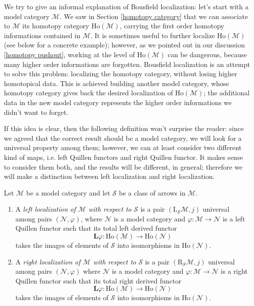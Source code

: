 We try to give an informal explanation of Bousfield localization: let's start with a model category $\mathcal M$. We saw in Section \ref{homotopy category} that we can associate to $\mathcal M$ its homotopy category $\mathrm{Ho}(\mathcal M)$, carrying the first order homotopy informations contained in $\mathcal M$. It is sometimes useful to further localize $\mathrm{Ho}(\mathcal M)$ (see below for a concrete example); however, as we pointed out in our discussion \ref{homotopy pushout}, working at the level of $\mathrm{Ho}(\mathcal M)$ can be dangerous, because many higher order informations are forgotten. Bousfield localization is an attempt to solve this problem: localizing the homotopy category, without losing higher homotopical data. This is achieved building another model category, whose homotopy category gives back the desired localization of $\mathrm{Ho}(\mathcal M)$; the additional data in the new model category represents the higher order informations we didn't want to forget.

If this idea is clear, then the following definition won't surprise the reader: since we agreed that the correct result should be a model category, we will look for a universal property among them; however, we can at least consider two different kind of maps, i.e. left Quillen functors and right Quillen functor. It makes sense to consider them both, and the results will be different, in general; therefore we will make a distinction between left localization and right localization.

\begin{defin} \label{def left right localization}
Let $\mathcal M$ be a model category and let $\mathcal S$ be a class of arrows in $\mathcal M$.
\begin{enumerate}
\item A \emph{left localization of $\mathcal M$ with respect to $\mathcal S$} is a pair $(\mathrm L_{\mathcal S} \mathcal M, j)$ universal among pairs $(\mathcal N, \varphi)$, where $\mathcal N$ is a model category and $\varphi \colon \mathcal M \to \mathcal N$ is a left Quillen functor such that its total left derived functor
\[
\mathbf L \varphi \colon \mathrm{Ho}(\mathcal M) \to \mathrm{Ho}(\mathcal N)
\]
takes the images of elements of $\mathcal S$ into isomorphisms in $\mathrm{Ho}(\mathcal N)$.

\item A \emph{right localization of $\mathcal M$ with respect to $\mathcal S$} is a pair $(\mathrm R_{\mathcal S} \mathcal M, j)$ universal among pairs $(\mathcal N, \varphi)$ where $\mathcal N$ is a model category and $\varphi \colon \mathcal M \to \mathcal N$ is a right Quillen functor such that its total right derived functor
\[
\mathbf L \varphi \colon \mathrm{Ho}(\mathcal M) \to \mathrm{Ho}(\mathcal N)
\]
takes the images of elements of $\mathcal S$ into isomorphisms in $\mathrm{Ho}(\mathcal N)$.
\end{enumerate}
\end{defin}


